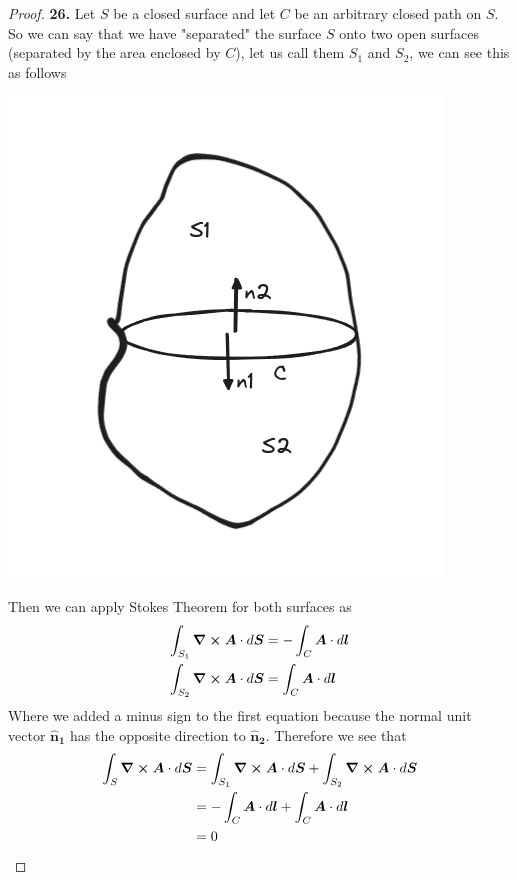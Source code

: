 \documentclass[11pt]{article}
\theoremstyle{definition}
\begin{document}
\begin{proof}{\textbf{26.}}
    Let $S$ be a closed surface and let $C$ be an arbitrary closed path on $S$.
    So we can say that we have "separated" the surface $S$ onto
    two open surfaces (separated by the area enclosed by $C$),
    let us call them $S_1$ and $S_2$, we can see this as follows
    \begin{center}
        \includegraphics[scale=0.4]{ch1-26.png}
    \end{center}
    Then we can apply Stokes Theorem for both surfaces as
    \begin{align*}
        \int_{S_1} \curl \bm{A} \cdot d\bm{S} &= -\int_{C} \bm{A}\cdot d\bm{l}\\
        \int_{S_2} \curl \bm{A} \cdot d\bm{S} &= \int_{C} \bm{A}\cdot d\bm{l}
    \end{align*}
    Where we added a minus sign to the first equation because the normal
    unit vector $\bm{\hat{n}_1}$ has the opposite direction to $\bm{\hat{n}_2}$.
    Therefore we see that
    \begin{align*}
        \int_{S} \curl \bm{A} \cdot d\bm{S}
        &= \int_{S_1} \curl \bm{A} \cdot d\bm{S}
        + \int_{S_2} \curl \bm{A} \cdot d\bm{S}\\
        &= -\int_{C} \bm{A}\cdot d\bm{l}
        + \int_{C} \bm{A}\cdot d\bm{l}\\
        &= 0
    \end{align*}
\end{proof}
\end{document}
